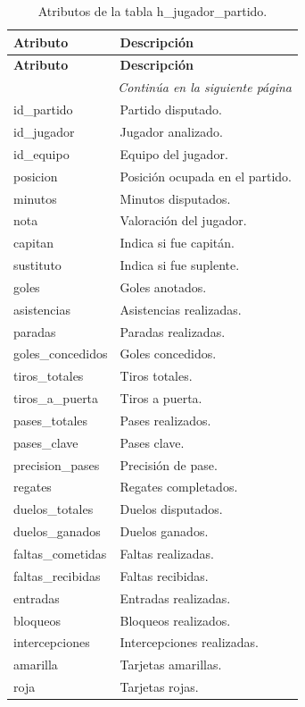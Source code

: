 \begin{longtable}{|l|l|}
\caption{Atributos de la tabla h\_jugador\_partido.} \\

\hline
\textbf{Atributo} & \textbf{Descripción} \\
\hline
\endfirsthead

\hline
\textbf{Atributo} & \textbf{Descripción} \\
\hline
\endhead

\hline
\multicolumn{2}{r}{\textit{Continúa en la siguiente página}} \\
\hline
\endfoot

\hline
\endlastfoot

id\_partido & Partido disputado. \\
id\_jugador & Jugador analizado. \\
id\_equipo & Equipo del jugador. \\
posicion & Posición ocupada en el partido. \\
minutos & Minutos disputados. \\
nota & Valoración del jugador. \\
capitan & Indica si fue capitán. \\
sustituto & Indica si fue suplente. \\
goles & Goles anotados. \\
asistencias & Asistencias realizadas. \\
paradas & Paradas realizadas. \\
goles\_concedidos & Goles concedidos. \\
tiros\_totales & Tiros totales. \\
tiros\_a\_puerta & Tiros a puerta. \\
pases\_totales & Pases realizados. \\
pases\_clave & Pases clave. \\
precision\_pases & Precisión de pase. \\
regates & Regates completados. \\
duelos\_totales & Duelos disputados. \\
duelos\_ganados & Duelos ganados. \\
faltas\_cometidas & Faltas realizadas. \\
faltas\_recibidas & Faltas recibidas. \\
entradas & Entradas realizadas. \\
bloqueos & Bloqueos realizados. \\
intercepciones & Intercepciones realizadas. \\
amarilla & Tarjetas amarillas. \\
roja & Tarjetas rojas. \\
\hline

\end{longtable}

